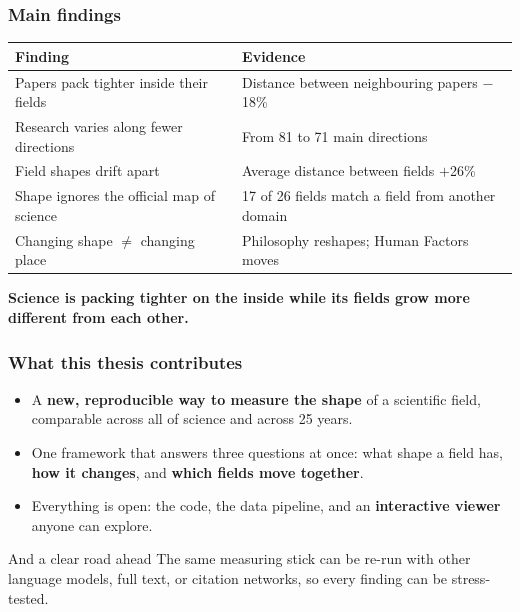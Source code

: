 \documentclass[
	11pt, %
	aspectratio=169, %
]{beamer}
\begin{document}
\begin{frame}
	\frametitle{Main findings}

	\begin{table}
		\centering
		\small
		\begin{tabular}{@{}ll@{}}
			\toprule
			\textbf{Finding} & \textbf{Evidence} \\
			\midrule
			Papers pack tighter inside their fields & Distance between neighbouring papers $-$18\% \\
			\addlinespace[0.65em]
			Research varies along fewer directions & From 81 to 71 main directions \\
			\addlinespace[0.65em]
			Field shapes drift apart & Average distance between fields $+$26\% \\
			\addlinespace[0.65em]
			Shape ignores the official map of science & 17 of 26 fields match a field from another domain \\
			\addlinespace[0.65em]
			Changing shape $\neq$ changing place & Philosophy reshapes; Human Factors moves \\
			\bottomrule
		\end{tabular}
	\end{table}

	\bigskip

	\centering
	\textbf{Science is packing tighter on the inside while its fields grow more different from each other.}
\end{frame}


\begin{frame}
	\frametitle{What this thesis contributes}

	\begin{itemize}
		\setlength{\itemsep}{0.9em}
		\item A \textbf{new, reproducible way to measure the shape} of a scientific field, comparable across all of science and across 25 years.
		\item One framework that answers three questions at once: what shape a field has, \textbf{how it changes}, and \textbf{which fields move together}.
		\item Everything is open: the code, the data pipeline, and an \textbf{interactive viewer} anyone can explore.
	\end{itemize}

	\bigskip

	\begin{block}{And a clear road ahead}
		The same measuring stick can be re-run with other language models, full text, or citation networks, so every finding can be stress-tested.
	\end{block}
\end{frame}
\end{document}
